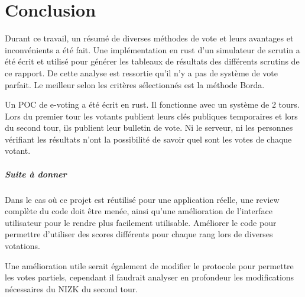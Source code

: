 \documentclass[../report]{subfiles}
\begin{document}
\chapter{Conclusion}

Durant ce travail, un résumé de diverses méthodes de vote et leurs avantages et inconvénients a été fait.
Une implémentation en rust d'un simulateur de scrutin a été écrit et utilisé pour générer les tableaux
de résultats des différents scrutins de ce rapport.
De cette analyse est ressortie qu'il n'y a pas de système de vote parfait. Le meilleur selon les critères sélectionnés est la méthode Borda.

Un POC de e-voting a été écrit en rust. Il fonctionne avec un système de 2 tours. Lors du premier tour
les votants publient leurs clés publiques temporaires et lors du second tour, ils publient leur bulletin de vote.
Ni le serveur, ni les personnes vérifiant les résultats n'ont la possibilité de savoir quel sont les votes de chaque votant.

\paragraph{Suite à donner}

Dans le cas où ce projet est réutilisé pour une application réelle, une review complète du code doit être menée, ainsi
qu'une amélioration de l'interface utilisateur pour le rendre plus facilement utilisable.
Améliorer le code pour permettre d'utiliser des scores différents pour chaque rang lors de diverses votations. 

Une amélioration utile serait également de modifier le protocole pour permettre les votes partiels, cependant il faudrait 
analyser en profondeur les modifications nécessaires du NIZK du second tour.
\end{document}
